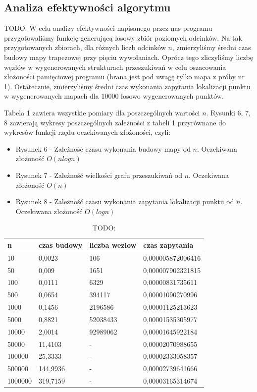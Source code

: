 \documentclass[11pt,a4paper]{article}
\begin{document}
\subsection{Analiza efektywności algorytmu}
TODO:
W celu analizy efektywności napisanego przez nas programu
przygotowaliśmy funkcję generującą losowy zbiór 
poziomych odcinków. Na tak przygotowanych zbiorach,
dla różnych liczb odcinków $n$, zmierzyliśmy średni
czas budowy mapy trapezowej przy pięciu wywołaniach.
Oprócz tego zliczyliśmy liczbę węzłów w wygenerowanych
strukturach przeszukiwań w celu oszacowania złożoności
pamięciowej programu (brana jest pod uwagę tylko mapa
z próby nr 1). Ostatecznie, zmierzyliśmy średni czas
wykonania zapytania lokalizacji punktu w wygenerowanych
mapach dla 10000 losowo wygenerowanych punktów.

Tabela 1 zawiera wszystkie pomiary dla poszczególnych
wartości $n$. Rysunki 6, 7, 8 zawierają wykresy
poszczególnych zależności z tabeli 1 przyrównane do wykresów
funkcji rzędu oczekiwanych złożoności, czyli:
\begin{itemize}
    \item Rysunek 6 
    - Zależność czasu wykonania budowy mapy od $n$. 
    Oczekiwana złożoność $O(nlogn)$
    \item Rysunek 7
    - Zależność wielkości grafu przeszukiwań od $n$. 
    Oczekiwana złożoność $O(n)$
    \item Rysunek 8 
    - Zależność czasu wykonania zapytania lokalizacji punktu od $n$. 
    Oczekiwana złożoność $O(logn)$
\end{itemize}

\begin{table}[H]
    \centering
    \begin{tabular}{|l|l|l|l|}
    \hline
        n & czas budowy & liczba wezlow & czas zapytania \\ \hline
        10 & 0,0023 & 106 & 0,000005872006416 \\ \hline
        50 & 0,009 & 1651 & 0,000007902321815 \\ \hline
        100 & 0,0111 & 6329 & 0,00000831735611 \\ \hline
        500 & 0,0654 & 394117 & 0,00001090270996 \\ \hline
        1000 & 0,1456 & 2196586 & 0,00001125213623 \\ \hline
        5000 & 0,8821 & 52038433 & 0,00001535305977 \\ \hline
        10000 & 2,0014 & 92989062 & 0,00001645922184 \\ \hline
        50000 & 11,4103 & - & 0,00002070988655 \\ \hline
        100000 & 25,3333 & - & 0,00002333058357 \\ \hline
        500000 & 144,9936 & - & 0,00002739641666 \\ \hline
        1000000 & 319,7159 & - & 0,00003165314674 \\ \hline
    \end{tabular}
    \caption{TODO:}
\end{table}
\end{document}
